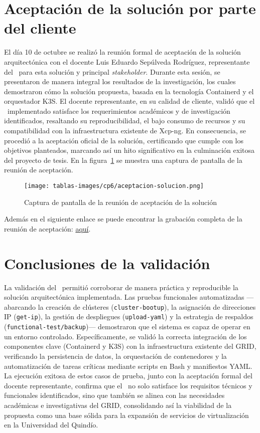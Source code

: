 \section{Aceptación de la solución por parte del cliente}\label{sec:aceptacion-solucion}
\noindent
El día 10 de octubre se realizó la reunión formal de aceptación de la solución arquitectónica con el docente Luis Eduardo Sepúlveda Rodríguez, representante del \GRID\ para esta solución y principal \textit{stakeholder}. Durante esta sesión, se presentaron de manera integral los resultados de la investigación, los cuales demostraron cómo la solución propuesta, basada en la tecnología Containerd y el orquestador K3S. El docente representante, en su calidad de cliente, validó que el \PMV\ implementado satisface los requerimientos académicos y de investigación identificados, resaltando su reproducibilidad, el bajo consumo de recursos y su compatibilidad con la infraestructura existente de Xcp-ng. En consecuencia, se procedió a la aceptación oficial de la solución, certificando que cumple con los objetivos planteados, marcando así un hito significativo en la culminación exitosa del proyecto de tesis. En la figura~\ref{fig:aceptacion-solucion} se muestra una captura de pantalla de la reunión de aceptación.
\begin{figure}[H]
    \centering
    \texttt{[image: tablas-images/cp6/aceptacion-solucion.png]}
    \caption{Captura de pantalla de la reunión de aceptación de la solución}\label{fig:aceptacion-solucion}
\end{figure}
\noindent
Además en el siguiente enlace se puede encontrar la grabación completa de la reunión de aceptación: \href{https://drive.google.com/file/d/1vEsmobYR2ZNxxkTWbN93kyu06ydDNxWd/view?usp=sharing}{aquí}.
\section{Conclusiones de la validación}
\noindent
La validación del \PMV\ permitió corroborar de manera práctica 
y reproducible la solución arquitectónica implementada. Las pruebas 
funcionales automatizadas ---abarcando la creación de clústeres (\texttt{cluster-bootup}), 
la asignación de direcciones IP (\texttt{get-ip}), la gestión de despliegues (\texttt{upload-yaml}) 
y la estrategia de respaldos (\texttt{functional-test/backup})--- demostraron que el sistema 
es capaz de operar en un entorno controlado. Específicamente, 
se validó la correcta integración de los componentes clave (Containerd y K3S) con la 
infraestructura existente del GRID, verificando la persistencia de datos, la orquestación 
de contenedores y la automatización de tareas críticas mediante scripts en Bash y manifiestos YAML. 
La ejecución exitosa de estos casos de prueba, junto con la aceptación formal del docente 
representante, confirma que el \PMV\ no solo satisface los requisitos técnicos y funcionales 
identificados, sino que también se alinea con las necesidades académicas e investigativas 
del GRID, consolidando así la viabilidad de la propuesta como una base sólida para la 
expansión de servicios de virtualización en la Universidad del Quindío.
